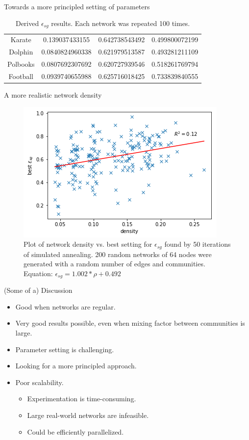 \documentclass{beamer}
\begin{document}
\begin{frame}[allowframebreaks]{Towards a more principled setting of parameters}
\begin{table}
\begin{tabular}{c c c c}
Karate    &  0.139037433155  &   0.642738543492  &     0.499800072199 \\

Dolphin  &   0.0840824960338   & 0.621979513587      & 0.493281211109 \\

Polbooks  &  0.0807692307692  &  0.620727939546     &  0.518261769794\\

Football  &  0.0939740655988  & 0.625716018425   &    0.733839840555\\	
	\end{tabular}
	\caption{Derived $\epsilon_{sg}$ results. Each network was repeated 100 times.}
	\end{table}
	\end{frame}
	
	\begin{frame}{A more realistic network density}
		\begin{figure}
\includegraphics[scale=0.65]{derived_results_realistic.png}
\caption{Plot of network density vs. best setting for $\epsilon_{sg}$ found by 50 iterations of simulated annealing. 200 random networks of 64 nodes were generated with a random number of edges and communities. Equation: $\epsilon_{sg} = 1.002*\rho + 0.492$}
\end{figure}
	\end{frame}
	
		
	\begin{frame}{(Some of a) Discussion}
	\begin{itemize}
	\item Good when networks are regular.
	\item Very good results possible, even when mixing factor between communities is large.
	\item Parameter setting is challenging. 
	\item Looking for a more principled approach. 
	\item Poor scalability.
	\begin{itemize}
	\item Experimentation is time-consuming.
	\item Large real-world networks are infeasible.
	\item Could be efficiently parallelized. 
	\end{itemize}
	\end{itemize}
	\end{frame}
	
\end{document}
